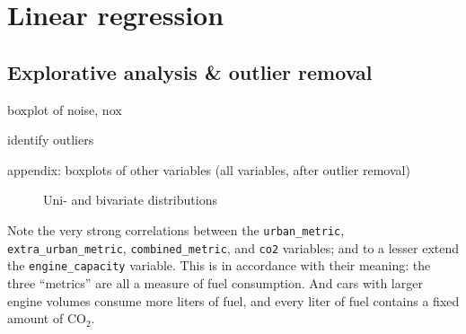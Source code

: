 \documentclass[a4paper, 12pt]{article}
\newcommand{\var}[1]{\texttt{#1}}
\begin{document}


\section{Linear regression}

\subsection*{Explorative analysis \& outlier removal}

boxplot of noise, nox

identify outliers

appendix: boxplots of other variables (all variables, after outlier removal)

\begin{figure}
  \caption{Uni- and bivariate distributions}
  \label{pairs}
\end{figure}

Note the very strong correlations between the \var{urban\_metric}, \var{extra\_urban\_metric}, \var{combined\_metric}, and \var{co2} variables; and to a lesser extend the \var{engine\_capacity} variable. This is in accordance with their meaning: the three ``metrics'' are all a measure of fuel consumption. And cars with larger engine volumes consume more liters of fuel, and every liter of fuel contains a fixed amount of $\mathrm{CO_2}$.
\end{document}
